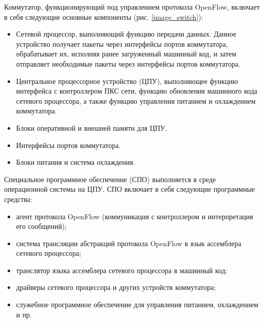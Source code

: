 \documentclass[oneside,final,12pt]{extarticle}
\begin{document}
        Коммутатор, функционирующий под управлением протокола OpenFlow, 
        включает в себя следующие основные компоненты (рис. \ref{image_switch}):
        
        \begin{itemize}
            \item Сетевой процессор, выполняющий функцию передачи данных. Данное устройство получает пакеты через интерфейсы портов коммутатора, обрабатывает их, исполняя ранее загруженный машинный код, и затем отправляет необходимые пакеты через интерфейсы портов коммутатора.
            \item Центральное процессорное устройство (ЦПУ), выполняющее функцию интерфейса с контроллером ПКС сети, функцию обновления машинного кода сетевого процессора, а также функцию управления питанием и охлаждением коммутатора.
            \item Блоки оперативной и внешней памяти для ЦПУ.
            \item Интерфейсы портов коммутатора.
            \item Блоки питания и система охлаждения.
        \end{itemize}

        Специальное программное обеспечение (СПО) выполняется в среде операционной системы на ЦПУ. 
        СПО включает в себя следующие программные средства: 
        
        \begin{itemize}
            \item агент протокола OpenFlow (коммуникация с контроллером и интерпретация его сообщений);
            \item система трансляции абстракций протокола OpenFlow в язык ассемблера сетевого процессора;
            \item транслятор языка ассемблера сетевого процессора в машинный код;
            \item драйверы сетевого процессора и других устройств коммутатора;
            \item служебное программное обеспечение для управления питанием, охлаждением и пр.
        \end{itemize}
\end{document}
